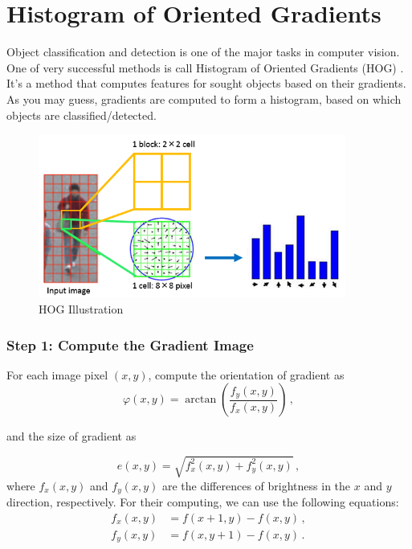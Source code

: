 \documentclass[12pt]{article}
\begin{document}
\section*{Histogram of Oriented Gradients}

Object classification and detection is one of the major tasks in computer vision.
One of very successful methods is call Histogram of Oriented Gradients (HOG) \cite{dalal}.
It's a method that computes features for sought objects based on their gradients.
As you may guess, gradients are computed to form a histogram, based on which
objects are classified/detected.

\begin{figure}[h!]
    \center
    \includegraphics[width=0.9\textwidth]{hog_scheme.png}
    \caption{HOG Illustration \cite{img}}
    \label{fig:hog}
\end{figure}

\subsubsection*{Step 1: Compute the Gradient Image}

For each image pixel $(x, y)$, compute the orientation of gradient as
\begin{equation}
    \varphi(x,y) = \arctan \left( \frac{f_y(x,y)}{f_x(x,y)} \right) \,,
\end{equation}

and the size of gradient as

\begin{equation}
    e(x,y) = \sqrt{f_x^2(x,y) + f_y^2(x,y)} \,,
\end{equation}
where $f_x(x,y)$ and $f_y(x,y)$ are the differences of brightness in the $x$ and $y$ direction, respectively.
For their computing, we can use the following equations:
\begin{eqnarray}
    f_x(x,y) &= f(x+1,y) - f(x,y) \,, \\
    f_y(x,y) &= f(x,y+1) - f(x,y) \,.
\end{eqnarray}
\end{document}
